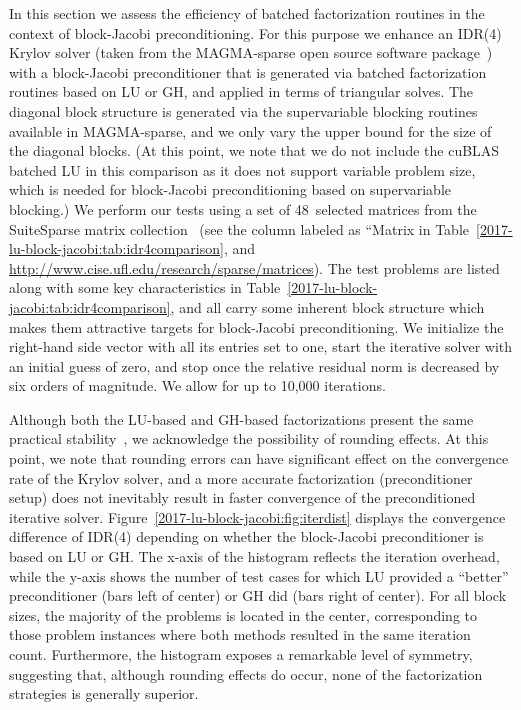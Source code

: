 In this section we assess the efficiency of batched factorization routines in 
the context of block-Jacobi preconditioning.
For this purpose we enhance
an IDR(4) Krylov solver (taken from the MAGMA-sparse open source software package~\cite{ashes2016}) 
with a block-Jacobi preconditioner that is generated via 
batched factorization routines based on LU or GH, and applied in terms of triangular solves.
The diagonal block structure is generated via the supervariable blocking routines available in MAGMA-sparse, 
and we only vary the upper bound for the size of the diagonal blocks.
(At this point, we note that we do not include the cuBLAS batched LU 
in this comparison as it does not support variable problem size, which is needed for block-Jacobi preconditioning based on supervariable blocking.)
We perform our tests using a set of 48~selected matrices from the SuiteSparse matrix
collection~\cite{ufmc} (see the column labeled as ``Matrix in Table~\ref{2017-lu-block-jacobi:tab:idr4comparison}, and 
\url{http://www.cise.ufl.edu/research/sparse/matrices}). 
The test problems are listed along with some key characteristics in Table~\ref{2017-lu-block-jacobi:tab:idr4comparison},
and all carry some inherent block structure
which makes them attractive targets for block-Jacobi preconditioning.
We initialize the right-hand side vector with all its entries set to one,
start the iterative solver with an initial guess of zero,
and stop once the relative residual norm is decreased by six orders of magnitude.
We allow for up to 10,000 iterations. 

Although both the LU-based and GH-based factorizations present the same practical stability~\cite{Dek97}, 
we acknowledge the possibility of rounding effects. 
At this point, we note that rounding errors can have significant effect on
the convergence rate of the Krylov solver, and a more accurate factorization (preconditioner setup) does not inevitably result in
faster convergence of the preconditioned iterative solver. 
Figure~\ref{2017-lu-block-jacobi:fig:iterdist}
displays the convergence difference
of IDR(4) depending on 
whether the block-Jacobi preconditioner is based 
on LU or GH.
The x-axis of the histogram reflects the iteration overhead,
while the y-axis shows the number of test cases for which 
LU provided a ``better'' preconditioner (bars left of center) or
GH did (bars right of center).
For all block sizes, the majority of the problems is located in the center,
corresponding to those problem instances where both methods resulted in the same iteration count.
Furthermore, the histogram exposes a remarkable level of symmetry,
suggesting that, although rounding effects do occur, none of the
factorization strategies is generally superior.


